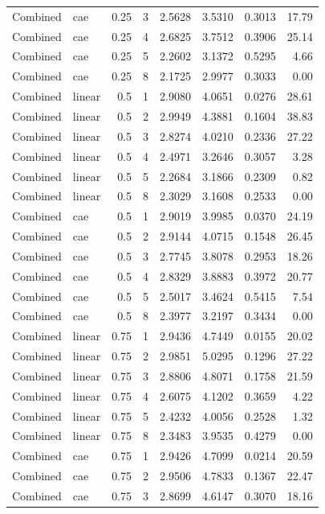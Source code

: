 \begin{longtable}{llrrrrrr}
Combined & cae & 0.25 & 3 & 2.5628 & 3.5310 & 0.3013 & 17.79 \\
Combined & cae & 0.25 & 4 & 2.6825 & 3.7512 & 0.3906 & 25.14 \\
Combined & cae & 0.25 & 5 & 2.2602 & 3.1372 & 0.5295 & 4.66 \\
Combined & cae & 0.25 & 8 & 2.1725 & 2.9977 & 0.3033 & 0.00 \\
Combined & linear & 0.5 & 1 & 2.9080 & 4.0651 & 0.0276 & 28.61 \\
Combined & linear & 0.5 & 2 & 2.9949 & 4.3881 & 0.1604 & 38.83 \\
Combined & linear & 0.5 & 3 & 2.8274 & 4.0210 & 0.2336 & 27.22 \\
Combined & linear & 0.5 & 4 & 2.4971 & 3.2646 & 0.3057 & 3.28 \\
Combined & linear & 0.5 & 5 & 2.2684 & 3.1866 & 0.2309 & 0.82 \\
Combined & linear & 0.5 & 8 & 2.3029 & 3.1608 & 0.2533 & 0.00 \\
Combined & cae & 0.5 & 1 & 2.9019 & 3.9985 & 0.0370 & 24.19 \\
Combined & cae & 0.5 & 2 & 2.9144 & 4.0715 & 0.1548 & 26.45 \\
Combined & cae & 0.5 & 3 & 2.7745 & 3.8078 & 0.2953 & 18.26 \\
Combined & cae & 0.5 & 4 & 2.8329 & 3.8883 & 0.3972 & 20.77 \\
Combined & cae & 0.5 & 5 & 2.5017 & 3.4624 & 0.5415 & 7.54 \\
Combined & cae & 0.5 & 8 & 2.3977 & 3.2197 & 0.3434 & 0.00 \\
Combined & linear & 0.75 & 1 & 2.9436 & 4.7449 & 0.0155 & 20.02 \\
Combined & linear & 0.75 & 2 & 2.9851 & 5.0295 & 0.1296 & 27.22 \\
Combined & linear & 0.75 & 3 & 2.8806 & 4.8071 & 0.1758 & 21.59 \\
Combined & linear & 0.75 & 4 & 2.6075 & 4.1202 & 0.3659 & 4.22 \\
Combined & linear & 0.75 & 5 & 2.4232 & 4.0056 & 0.2528 & 1.32 \\
Combined & linear & 0.75 & 8 & 2.3483 & 3.9535 & 0.4279 & 0.00 \\
Combined & cae & 0.75 & 1 & 2.9426 & 4.7099 & 0.0214 & 20.59 \\
Combined & cae & 0.75 & 2 & 2.9506 & 4.7833 & 0.1367 & 22.47 \\
Combined & cae & 0.75 & 3 & 2.8699 & 4.6147 & 0.3070 & 18.16 \\

\end{longtable}
